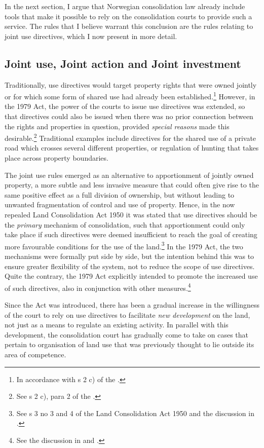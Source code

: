 In the next section, I argue that Norwegian consolidation law already include tools that make it possible to rely on the consolidation courts to provide such a service. The rules that I believe warrant this conclusion are the rules relating to joint use directives, which I now present in more detail.

\subsection{Joint use, Joint action and Joint investment}\label{sec:3}

Traditionally, use directives would target property rights that were owned jointly or for which some form of shared use had already been established.\footnote{In accordance with s 2 c) of the \cite{lca79} .} However, in the 1979 Act, the power of the courts to issue use directives was extended, so that directives could also be issued when there was no prior connection between the rights and properties in question, provided \emph{special reasons} made this desirable.\footnote{See s 2 c), para 2 of the \cite{lca79}.} Traditional examples include directives for the shared use of a private road which crosses several different properties, or regulation of hunting that takes place across property boundaries.

The joint use rules emerged as an alternative to apportionment of jointly owned property, a more subtle and less invasive measure that could often give rise to the same positive effect as a full division of ownership, but without leading to unwanted fragmentation of control and use of property. Hence, in the now repealed Land Consolidation Act 1950 it was stated that use directives should be the \emph{primary} mechanism of consolidation, such that apportionment could only take place if such directives were deemed insufficient to reach the goal of creating more favourable conditions for the use of the land.\footnote{See s 3 no 3 and 4 of the Land Consolidation Act 1950 and the discussion in \cite[30-37]{nou76}.} In the 1979 Act, the two mechanisms were formally put side by side, but the intention behind this was to ensure greater flexibility of the system, not to reduce the scope of use directives. Quite the contrary, the 1979 Act explicitly intended to promote the increased use of such directives, also in conjunction with other measures.\footnote{See the discussion in \cite[35-37]{nou76} and \cite[47-48]{otprp56}.}

Since the Act was introduced, there has been a gradual increase in the willingness of the court to rely on use directives to facilitate \emph{new development} on the land, not just as a means to regulate an existing activity. In parallel with this development, the consolidation court has gradually come to take on cases that pertain to organisation of land use that was previously thought to lie outside its area of competence. 

